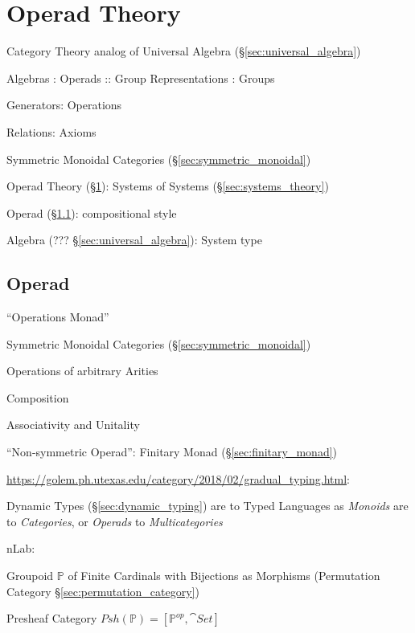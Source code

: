 \section{Operad Theory}\label{sec:operad_theory}

Category Theory analog of Universal Algebra
(\S\ref{sec:universal_algebra})

Algebras : Operads :: Group Representations : Groups

Generators: Operations

Relations: Axioms

Symmetric Monoidal Categories
(\S\ref{sec:symmetric_monoidal})

Operad Theory (\S\ref{sec:operad_theory}): Systems of Systems
(\S\ref{sec:systems_theory})

Operad (\S\ref{sec:operad}): compositional style

Algebra (??? \S\ref{sec:universal_algebra}): System type



\subsection{Operad}\label{sec:operad}

``Operations Monad''

Symmetric Monoidal Categories
(\S\ref{sec:symmetric_monoidal})

Operations of arbitrary Arities

Composition

Associativity and Unitality

``Non-symmetric Operad'': Finitary Monad (\S\ref{sec:finitary_monad})

\url{https://golem.ph.utexas.edu/category/2018/02/gradual_typing.html}:

Dynamic Types (\S\ref{sec:dynamic_typing}) are to Typed Languages as
\emph{Monoids} are to \emph{Categories}, or \emph{Operads} to
\emph{Multicategories}

nLab:

Groupoid $\mathbb{P}$ of Finite Cardinals with Bijections as Morphisms
(Permutation Category \S\ref{sec:permutation_category})

Presheaf Category $Psh(\mathbb{P}) = [\mathbb{P}^{op}, \cat{Set}]$

